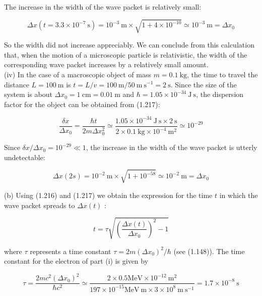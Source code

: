 \documentclass[10pt]{article}
\begin{document}
The increase in the width of the wave packet is relatively small:


\begin{equation*}
\Delta x\left(t=3.3 \times 10^{-7} \mathrm{~s}\right)=10^{-3} \mathrm{~m} \times \sqrt{1+4 \times 10^{-10}} \simeq 10^{-3} \mathrm{~m}=\Delta x_{0} \tag{1.223}
\end{equation*}


So the width did not increase appreciably. We can conclude from this calculation that, when the motion of a microscopic particle is relativistic, the width of the corresponding wave packet increases by a relatively small amount.\\
(iv) In the case of a macroscopic object of mass $m=0.1 \mathrm{~kg}$, the time to travel the distance $L=100 \mathrm{~m}$ is $t=L / v=100 \mathrm{~m} / 50 \mathrm{~m} \mathrm{~s}^{-1}=2 \mathrm{~s}$. Since the size of the system is about $\Delta x_{0}=1 \mathrm{~cm}=0.01 \mathrm{~m}$ and $\hbar=1.05 \times 10^{-34} \mathrm{~J} \mathrm{~s}$, the dispersion factor for the object can be obtained from (1.217):


\begin{equation*}
\frac{\delta x}{\Delta x_{0}}=\frac{\hbar t}{2 m \Delta x_{0}^{2}} \simeq \frac{1.05 \times 10^{-34} \mathrm{~J} \mathrm{~s} \times 2 \mathrm{~s}}{2 \times 0.1 \mathrm{~kg} \times 10^{-4} \mathrm{~m}^{2}} \simeq 10^{-29} \tag{1.224}
\end{equation*}


Since $\delta x / \Delta x_{0}=10^{-29} \ll 1$, the increase in the width of the wave packet is utterly undetectable:


\begin{equation*}
\Delta x(2 s)=10^{-2} \mathrm{~m} \times \sqrt{1+10^{-58}} \simeq 10^{-2} \mathrm{~m}=\Delta x_{0} \tag{1.225}
\end{equation*}


(b) Using (1.216) and (1.217) we obtain the expression for the time $t$ in which the wave packet spreads to $\Delta x(t)$ :


\begin{equation*}
t=\tau \sqrt{\left(\frac{\Delta x(t)}{\Delta x_{0}}\right)^{2}-1} \tag{1.226}
\end{equation*}


where $\tau$ represents a time constant $\tau=2 m\left(\Delta x_{0}\right)^{2} / \hbar$ (see (1.148)). The time constant for the electron of part (i) is given by


\begin{equation*}
\tau=\frac{2 m c^{2}\left(\Delta x_{0}\right)^{2}}{\hbar c^{2}} \simeq \frac{2 \times 0.5 \mathrm{MeV} \times 10^{-12} \mathrm{~m}^{2}}{197 \times 10^{-15} \mathrm{MeV} \mathrm{~m} \times 3 \times 10^{8} \mathrm{~m} \mathrm{~s}^{-1}}=1.7 \times 10^{-8} \mathrm{~s} \tag{1.227}
\end{equation*}
\end{document}

